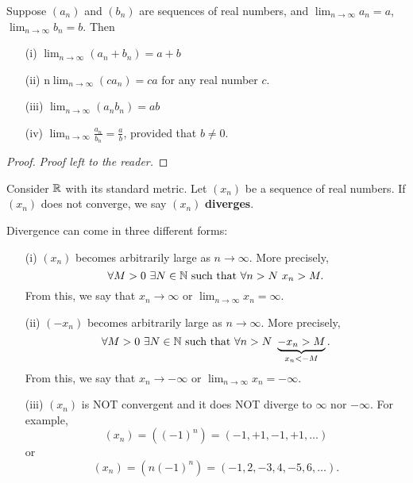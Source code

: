 \documentclass[a4paper]{article}
\begin{document}
\begin{theorem}
    Suppose \( ({a}_{n}) \) and \( ({b}_{n}) \) are sequences of real numbers, and \( \lim_{ n \to \infty  }  {a}_{n} = a   \), \( \lim_{ n \to \infty  } {b}_{n} = b  \). Then
    \begin{enumerate}
        \item[(i)] \( \lim_{ n \to \infty  }  ({a}_{n} + {b}_{n}) = a + b \)
        \item[(ii)] n\( \lim_{ n \to \infty  } ({ca}_{n}) = ca \) for any real number \( c  \).
        \item[(iii)] \( \lim_{ n \to \infty  }  ({a}_{n}{b}_{n}) = ab \)
        \item[(iv)] \( \lim_{ n \to \infty  } \frac{ {a}_{n} }{ {b}_{n} }  = \frac{ a }{ b }  \), provided that \( b \neq 0  \).
    \end{enumerate}
\end{theorem}
\begin{proof}
    \textit{Proof left to the reader.}
\end{proof}

\begin{definition}[ ]
    Consider \( \mathbb{R}  \) with its standard metric. Let \( ({x}_{n}) \) be a sequence of real numbers. If \( ({x}_{n}) \) does not converge, we say \( ({x}_{n}) \) \textbf{diverges}.
\end{definition}

Divergence can come in three different forms:
\begin{enumerate}
    \item[(i)] \( ({x}_{n}) \) becomes arbitrarily large as \( n \to \infty   \). More precisely, 
        \[  \forall M > 0 \ \exists N \in \mathbb{N} \ \text{such that} \ \forall n > N \ {x}_{n} > M.  \]
        From this, we say that \( {x}_{n} \to \infty   \) or \( \lim_{ n \to \infty  }  {x}_{n} = \infty  \).
    \item[(ii)] \( (-{x}_{n}) \) becomes arbitrarily large as \( n \to \infty   \). More precisely, 
        \[  \forall M > 0 \ \exists N \in \mathbb{N} \ \text{such that} \ \forall n > N \ \underbrace{-{x}_{n} > M}_{{x}_{n} < -M}.  \]
        From this, we say that \( {x}_{n} \to - \infty  \) or \( \lim_{ n \to \infty  }  {x}_{n} = - \infty  \).
    \item[(iii)] \( ({x}_{n}) \) is NOT convergent and it does NOT diverge to \( \infty  \) nor \( - \infty   \). For example, 
        \[  ({x}_{n}) = ((-1)^{n}) = (-1,+1,-1,+1, \dots) \]
        or
        \[  ({x}_{n}) = (n (-1)^{n}) = (-1,2, -3, 4, -5, 6, \dots). \]
\end{enumerate}
\end{document}
